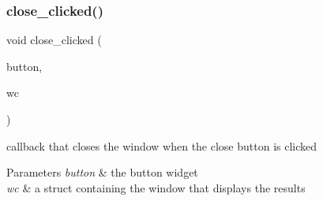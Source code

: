 \subsubsection{\texorpdfstring{close\+\_\+clicked()}{close\_clicked()}}
{\footnotesize\ttfamily void close\+\_\+clicked (\begin{DoxyParamCaption}\item[{Gtk\+Widget $\ast$}]{button,  }\item[{struct \hyperlink{structWinContainer}{Win\+Container} $\ast$}]{wc }\end{DoxyParamCaption})}



callback that closes the window when the close button is clicked 


\begin{DoxyParams}{Parameters}
{\em button} & the button widget \\
\hline
{\em wc} & a struct containing the window that displays the results \\
\hline
\end{DoxyParams}
